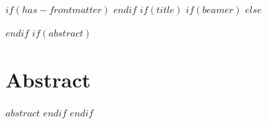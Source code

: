 $if(has-frontmatter)$
\frontmatter
$endif$
$if(title)$
$if(beamer)$
\frame{\titlepage}
$else$
\begin{singlespace}
    \maketitle
\end{singlespace}
$endif$
$if(abstract)$
\section*{Abstract}
$abstract$
$endif$
$endif$
\thispagestyle{fancy}